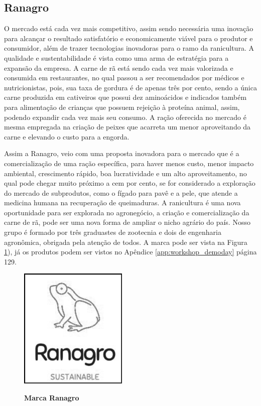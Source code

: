 \subsection{Ranagro}

O mercado está cada vez mais competitivo, assim sendo necessária uma inovação para alcançar o resultado satisfatório e economicamente viável para o produtor e consumidor, além de trazer tecnologias inovadoras para o ramo da ranicultura. A qualidade e sustentabilidade é vista como uma arma de estratégia para a expansão da empresa. A carne de rã está sendo cada vez mais valorizada e consumida em restaurantes, no qual passou a ser recomendados por médicos e nutricionistas, pois, sua taxa de gordura é de apenas três por cento, sendo a única carne produzida em cativeiros que possui dez aminoácidos e indicados também para alimentação de crianças que possuem rejeição à proteína animal, assim, podendo expandir cada vez mais seu consumo. A ração oferecida no mercado é mesma empregada na criação de peixes que acarreta um menor aproveitando da carne e elevando o custo para a engorda.

Assim a Ranagro, veio com uma proposta inovadora para o mercado que é a comercialização de uma ração específica, para haver menos custo, menor impacto ambiental, crescimento rápido, boa lucratividade e um alto aproveitamento, no qual pode chegar muito próximo a cem por cento, se for considerado a exploração do mercado de subprodutos, como o fígado para pavê e a pele, que atende a medicina humana na recuperação de queimaduras. A ranicultura é uma nova oportunidade para ser explorada no agronegócio, a criação e comercialização da carne de rã, pode ser uma nova forma de ampliar o nicho agrário do país. Nosso grupo é formado por três graduastes de zootecnia e dois de engenharia agronômica, obrigada pela atenção de todos. A marca pode ser vista na Figura \ref{figura_26}), já os produtos podem ser vistos no Apêndice \ref{app:workshop_demoday} página 129.



\begin{figure}[H]
\centering
\caption{\textbf{Marca Ranagro}}
\includegraphics[scale=0.7]{Imagens/ranagro.png}
\label{figura_26}
\end{figure}




